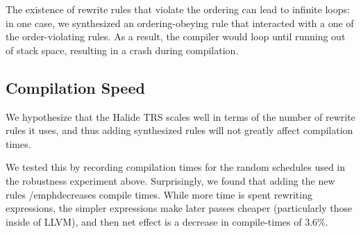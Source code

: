 \documentclass[sigplan,10pt,review,anonymous]{acmart}\settopmatter{printfolios=true,printccs=false,printacmref=false}
\newcommand{\NumOrderingProblems}{{\color{black} 46}\xspace}
\begin{document}
The existence of rewrite rules that violate the ordering can lead
to infinite loops: in one case, we synthesized an ordering-obeying rule that interacted
with a one of the order-violating rules.  As a result, the compiler
would loop until running out of stack space, resulting in a crash
during compilation.

\subsection{Compilation Speed}
\label{ssec:compilationspeed}

We hypothesize that the Halide TRS scales well in terms of the number of
rewrite rules it uses, and thus adding synthesized rules will not greatly affect
compilation times.

We tested this by recording compilation times for the random schedules
used in the robustness experiment above. Surprisingly, we found that
adding the new rules /emph{decreases} compile times. While more time
is spent rewriting expressions, the simpler expressions make later
passes cheaper (particularly those inside of LLVM), and then net
effect is a decrease in compile-times of 3.6\%.


\end{document}
